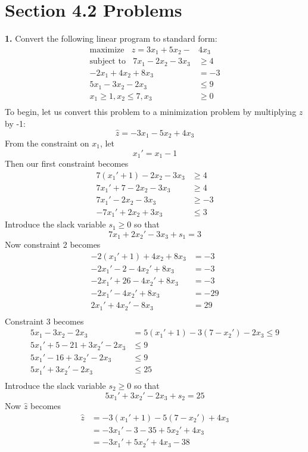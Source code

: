 \documentclass{article}
\begin{document}
\section*{Section 4.2 Problems}
\textbf{1.} Convert the following linear program to standard form:
\begin{align*}
    \text{maximize} \:\:\:\: z = 3x_1 + 5x_2 - &4x_3\\
    \text{subject to} \:\:\:\: 7x_1 - 2x_2 - 3x_3 &\geq 4\\
    -2x_1 + 4x_2 + 8x_3 &= -3\\
    5x_1 - 3x_2 - 2x_3 &\leq 9\\
    x_1 \geq 1, x_2 \leq 7, x_3 &\geq 0\\
\end{align*}
To begin, let us convert this problem to a minimization problem by multiplying $z$ by -1:
\[\hat{z} = -3x_1 - 5x_2 + 4x_3\]
From the constraint on $x_1$, let
\[x_1' = x_1 - 1\]
Then our first constraint becomes
\begin{align*}
    7(x_1' + 1) - 2x_2 - 3x_3 &\geq 4\\
    7x_1' + 7 - 2x_2 - 3x_3 &\geq 4\\
    7x_1' - 2x_2 - 3x_3 &\geq -3\\
    -7x_1' + 2x_2 + 3x_3 &\leq 3
\end{align*}
Introduce the slack variable $s_1 \geq 0$ so that
\[7x_1 + 2x_2' - 3x_3 + s_1 = 3\]
Now constraint 2 becomes
\begin{align*}
    -2(x_1' + 1) + 4x_2 + 8x_3 &= -3\\
    -2x_1' - 2  - 4x_2' + 8x_3 &= -3\\
    -2x_1' + 26 - 4x_2' + 8x_3 &= -3\\
    -2x_1' - 4x_2' + 8x_3 &= -29\\
    2x_1' + 4x_2' - 8x_3 &= 29\\
\end{align*}
Constraint 3 becomes
\begin{align*}
    5x_1 - 3x_2 - 2x_3 &= 5(x_1' + 1) - 3(7 - x_2') - 2x_3 \leq 9\\
    5x_1' + 5 - 21 + 3x_2' - 2x_3 &\leq 9\\
    5x_1' - 16 + 3x_2' - 2x_3 &\leq 9\\
    5x_1' + 3x_2' - 2x_3 &\leq 25\\
\end{align*}
Introduce the slack variable $s_2 \geq 0$ so that
\[5x_1' + 3x_2' - 2x_3 + s_2 = 25\]
Now $\hat{z}$ becomes
\begin{align*}
    \hat{z} &= -3(x_1' + 1) - 5(7 - x_2') + 4x_3 \\
    &= -3x_1' - 3 - 35 + 5x_2' + 4x_3 \\
    &= -3x_1' + 5x_2' + 4x_3 - 38
\end{align*}
\end{document}
